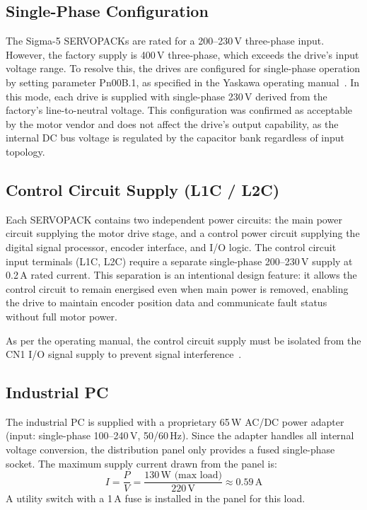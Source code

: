 \subsection{Single-Phase Configuration}

The Sigma-5 SERVOPACKs are rated for a 200--230\,V three-phase input. However, the factory supply is 400\,V three-phase, which exceeds the drive's input voltage range. To resolve this, the drives are configured for single-phase operation by setting parameter Pn00B.1, as specified in the Yaskawa operating manual~\cite{yaskawa_manual}. In this mode, each drive is supplied with single-phase 230\,V derived from the factory's line-to-neutral voltage. This configuration was confirmed as acceptable by the motor vendor and does not affect the drive's output capability, as the internal DC bus voltage is regulated by the capacitor bank regardless of input topology.

\subsection{Control Circuit Supply (L1C / L2C)}

Each SERVOPACK contains two independent power circuits: the main power circuit supplying the motor drive stage, and a control power circuit supplying the digital signal processor, encoder interface, and I/O logic. The control circuit input terminals (L1C, L2C) require a separate single-phase 200--230\,V supply at 0.2\,A rated current. This separation is an intentional design feature: it allows the control circuit to remain energised even when main power is removed, enabling the drive to maintain encoder position data and communicate fault status without full motor power.

As per the operating manual, the control circuit supply must be isolated from the CN1 I/O signal supply to prevent signal interference~\cite{yaskawa_manual}.

\subsection{Industrial PC}

The industrial PC is supplied with a proprietary 65\,W AC/DC power adapter (input: single-phase 100--240\,V, 50/60\,Hz). Since the adapter handles all internal voltage conversion, the distribution panel only provides a fused single-phase socket. The maximum supply current drawn from the panel is:
\[
I = \frac{P}{V} = \frac{130\,\text{W (max load)}}{220\,\text{V}} \approx 0.59\,\text{A}
\]
A utility switch with a 1\,A fuse is installed in the panel for this load.


